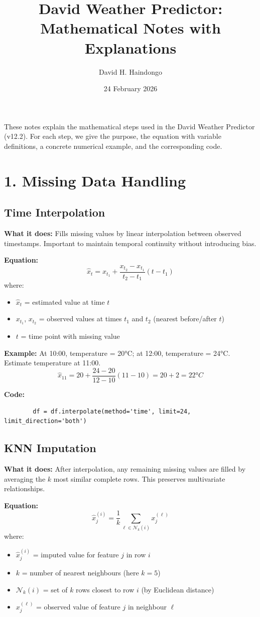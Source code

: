 \documentclass[12pt]{article}
\title{David Weather Predictor: Mathematical Notes with Explanations}
\author{David H. Haindongo}
\date{24 February 2026}
\begin{document}
	\maketitle
	\newpage
	These notes explain the mathematical steps used in the David Weather Predictor (v12.2). For each step, we give the purpose, the equation with variable definitions, a concrete numerical example, and the corresponding code.
	
	\section*{1. Missing Data Handling}
	
	\subsection*{Time Interpolation}
	\textbf{What it does:} Fills missing values by linear interpolation between observed timestamps. Important to maintain temporal continuity without introducing bias.
	
	\textbf{Equation:}
	\[
	\hat{x}_t = x_{t_1} + \frac{x_{t_2}-x_{t_1}}{t_2-t_1}(t-t_1)
	\]
	where:
	\begin{itemize}
		\item $\hat{x}_t$ = estimated value at time $t$
		\item $x_{t_1}$, $x_{t_2}$ = observed values at times $t_1$ and $t_2$ (nearest before/after $t$)
		\item $t$ = time point with missing value
	\end{itemize}
	
	\textbf{Example:} At 10:00, temperature = 20°C; at 12:00, temperature = 24°C. Estimate temperature at 11:00.
	\[
	\hat{x}_{11} = 20 + \frac{24-20}{12-10}(11-10) = 20 + 2 = 22°C
	\]
	
	\textbf{Code:}
	\begin{lstlisting}
		df = df.interpolate(method='time', limit=24, limit_direction='both')
	\end{lstlisting}
	
	\subsection*{KNN Imputation}
	\textbf{What it does:} After interpolation, any remaining missing values are filled by averaging the $k$ most similar complete rows. This preserves multivariate relationships.
	
	\textbf{Equation:}
	\[
	\hat{x}^{(i)}_j = \frac{1}{k}\sum_{\ell \in \mathcal{N}_k(i)} x^{(\ell)}_j
	\]
	where:
	\begin{itemize}
		\item $\hat{x}^{(i)}_j$ = imputed value for feature $j$ in row $i$
		\item $k$ = number of nearest neighbours (here $k=5$)
		\item $\mathcal{N}_k(i)$ = set of $k$ rows closest to row $i$ (by Euclidean distance)
		\item $x^{(\ell)}_j$ = observed value of feature $j$ in neighbour $\ell$
	\end{itemize}
	
\end{document}

